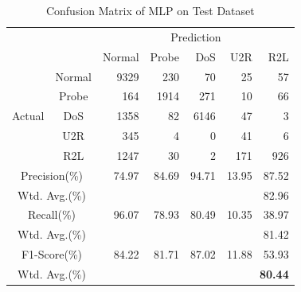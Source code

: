 \begin{table}[t]
    \caption{Confusion Matrix of MLP on Test Dataset}
    \centering
    \begin{tabular}{cc|rrrrr}
        \hline
        &  & \multicolumn{5}{c}{Prediction} \\
                        &        & Normal & Probe & DoS & U2R & R2L\\
        \hline
        \hline
        \multirow{5}{*}{Actual} & Normal & {\color{red}9329} &  230 &   70 &  25 &  57 \\
                                &  Probe &  164 & 1914 &  271 &  10 &  66 \\
                                &  DoS   & 1358 &   82 & {\color{red}6146} &  47 &   3 \\
                                &  U2R   &  345 &    4 &    0 &  {\color{red}41} &   6 \\
                                &  R2L   & 1247 &   30 &    2 & 171 & {\color{red}926} \\
        \hline
        \multicolumn{2}{c|}{Precision(\%)}   & 74.97 & 84.69 & 94.71 & 13.95 & 87.52\\
        \multicolumn{2}{c|}{Wtd. Avg.(\%)}   & \multicolumn{5}{r}{82.96}\\
        \hline
        \multicolumn{2}{c|}{Recall(\%)}      & 96.07 & 78.93 & 80.49 & 10.35 & 38.97\\
        \multicolumn{2}{c|}{Wtd. Avg.(\%)}   & \multicolumn{5}{r}{81.42}\\
        \hline
        \multicolumn{2}{c|}{F1-Score(\%)}    & 84.22 & 81.71 & 87.02 & 11.88 & 53.93\\
        \multicolumn{2}{c|}{Wtd. Avg.(\%)}   & \multicolumn{5}{r}{\textbf{\color{red}80.44}}\\
        \hline
    \end{tabular}
    \label{Tab:ConfusionMatrixMLP}
\end{table}


